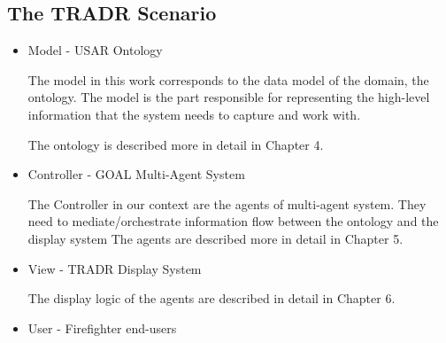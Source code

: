 \subsection{The TRADR Scenario}
\begin{itemize}
\item Model - USAR Ontology

The model in this work corresponds to the data model of the domain, the ontology. The model is the part responsible for representing the high-level information that the system needs to capture and work with.  

The ontology is described more in detail in Chapter 4. 

\item Controller - GOAL Multi-Agent System

The Controller in our context are the agents of multi-agent system. They need to mediate/orchestrate information flow between the ontology and the display system
The agents are described more in detail in Chapter 5.

\item View - TRADR Display System


The display logic of the agents are described in detail in Chapter 6.

\item User - Firefighter end-users



\end{itemize}

  
  